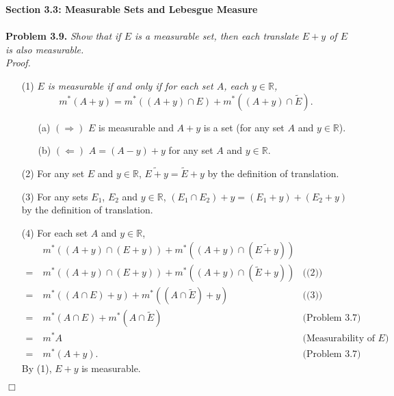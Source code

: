 \documentclass{article}
\begin{document}
\textbf{\large Section 3.3: Measurable Sets and Lebesgue Measure} \\\\



\textbf{Problem 3.9.}
\emph{Show that if $E$ is a measurable set, then each translate $E+y$ of $E$
is also measurable.} \\



\emph{Proof.}
\begin{enumerate}
\item[(1)]
  \emph{$E$ is measurable if and only if
  for each set $A$, each $y \in \mathbb{R}$,}
  \[
    m^{*}(A+y)
    = m^{*}((A+y) \cap E) + m^{*}((A+y) \cap \widetilde{E}).
  \]
  \begin{enumerate}
  \item[(a)]
    $(\Longrightarrow)$
    $E$ is measurable and
    $A+y$ is a set (for any set $A$ and $y \in \mathbb{R}$).

  \item[(b)]
    $(\Longleftarrow)$
    $A = (A-y) + y$ for any set $A$ and $y \in \mathbb{R}$.
  \end{enumerate}

\item[(2)]
  For any set $E$ and $y \in \mathbb{R}$,
  $\widetilde{E+y} = \widetilde{E}+y$ by the definition of translation.

\item[(3)]
  For any sets $E_1$, $E_2$ and $y \in \mathbb{R}$,
  $(E_1 \cap E_2)+y = (E_1+y) + (E_2+y)$ by the definition of translation.

\item[(4)]
  For each set $A$ and $y \in \mathbb{R}$,
  \begin{align*}
    &\: m^{*}((A+y) \cap (E+y)) + m^{*}((A+y) \cap (\widetilde{E+y})) \\
    =&\: m^{*}((A+y) \cap (E+y)) + m^{*}((A+y) \cap (\widetilde{E}+y))
      &\text{((2))} \\
    =&\: m^{*}((A \cap E)+y) + m^{*}((A \cap \widetilde{E})+y)
      &\text{((3))} \\
    =&\: m^{*}(A \cap E) + m^{*}(A \cap \widetilde{E})
      &\text{(Problem 3.7)} \\
    =&\: m^{*}A
      &\text{(Measurability of $E$)} \\
    =&\: m^{*}(A+y).
      &\text{(Problem 3.7)}
  \end{align*}
  By (1), $E+y$ is measurable.
\end{enumerate}
$\Box$ \\\\
\end{document}
